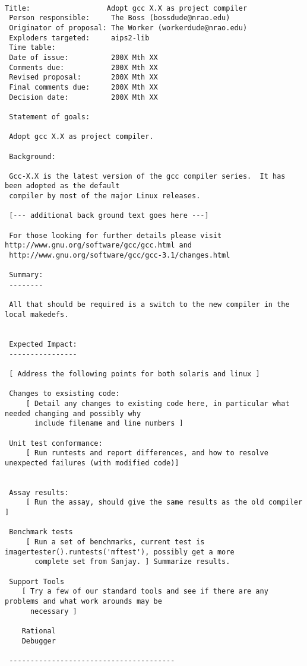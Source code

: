 \begin{verbatim}

Title:                  Adopt gcc X.X as project compiler
 Person responsible:     The Boss (bossdude@nrao.edu)
 Originator of proposal: The Worker (workerdude@nrao.edu)
 Exploders targeted:     aips2-lib
 Time table:
 Date of issue:          200X Mth XX
 Comments due:           200X Mth XX
 Revised proposal:       200X Mth XX
 Final comments due:     200X Mth XX
 Decision date:          200X Mth XX
 
 Statement of goals:
 
 Adopt gcc X.X as project compiler.
 
 Background:

 Gcc-X.X is the latest version of the gcc compiler series.  It has been adopted as the default
 compiler by most of the major Linux releases.  

 [--- additional back ground text goes here ---]

 For those looking for further details please visit http://www.gnu.org/software/gcc/gcc.html and
 http://www.gnu.org/software/gcc/gcc-3.1/changes.html
 
 Summary:
 --------

 All that should be required is a switch to the new compiler in the local makedefs.


 Expected Impact:
 ----------------

 [ Address the following points for both solaris and linux ]

 Changes to exsisting code:
     [ Detail any changes to existing code here, in particular what needed changing and possibly why
       include filename and line numbers ]

 Unit test conformance:
     [ Run runtests and report differences, and how to resolve unexpected failures (with modified code)]
    

 Assay results:
     [ Run the assay, should give the same results as the old compiler ]

 Benchmark tests
     [ Run a set of benchmarks, current test is imagertester().runtests('mftest'), possibly get a more
       complete set from Sanjay. ] Summarize results.

 Support Tools
    [ Try a few of our standard tools and see if there are any problems and what work arounds may be
      necessary ]

    Rational
    Debugger
 
 ---------------------------------------
\end{verbatim}

